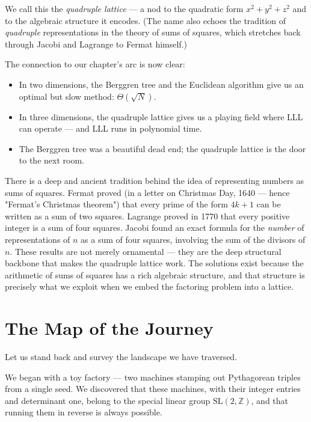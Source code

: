 \documentclass[11pt,openright,twoside]{book}
\theoremstyle{definition}
\begin{document}
We call this the \textit{quadruple lattice} --- a nod to the quadratic form $x^2 + y^2 + z^2$ and to the algebraic structure it encodes. (The name also echoes the tradition of \textit{quadruple} representations in the theory of sums of squares, which stretches back through Jacobi and Lagrange to Fermat himself.)

The connection to our chapter's arc is now clear:

\begin{itemize}[leftmargin=*]
\item In two dimensions, the Berggren tree and the Euclidean algorithm give us an optimal but slow method: $\Theta(\sqrt{N})$.
\item In three dimensions, the quadruple lattice gives us a playing field where LLL can operate --- and LLL runs in polynomial time.
\item The Berggren tree was a beautiful dead end; the quadruple lattice is the door to the next room.
\end{itemize}

There is a deep and ancient tradition behind the idea of representing numbers as sums of squares. Fermat proved (in a letter on Christmas Day, 1640 --- hence "Fermat's Christmas theorem") that every prime of the form $4k + 1$ can be written as a sum of two squares. Lagrange proved in 1770 that every positive integer is a sum of four squares. Jacobi found an exact formula for the \textit{number} of representations of $n$ as a sum of four squares, involving the sum of the divisors of $n$. These results are not merely ornamental --- they are the deep structural backbone that makes the quadruple lattice work. The solutions exist because the arithmetic of sums of squares has a rich algebraic structure, and that structure is precisely what we exploit when we embed the factoring problem into a lattice.


\bigskip


\section{The Map of the Journey}

Let us stand back and survey the landscape we have traversed.

We began with a toy factory --- two machines stamping out Pythagorean triples from a single seed. We discovered that these machines, with their integer entries and determinant one, belong to the special linear group $\mathrm{SL}(2, \mathbb{Z})$, and that running them in reverse is always possible.
\end{document}

